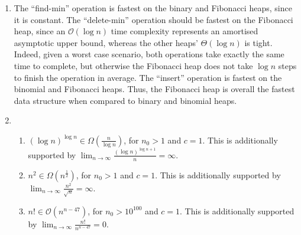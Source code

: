 \documentclass[12pt]{article}
\begin{document}
\begin{enumerate}
\begin{enumerate}
\begin{table}[htbp]
\begin{tabular}{l*{7}{r}}
        $       n$ & $\num{1.00E+10}$ & $\num{6.00E+11}$ & $\num{3.60E+13}$ & $\num{8.64E+14}$ & $\num{2.59E+16}$ & $\num{3.11E+17}$ & $\num{3.11E+19}$ \\
        $ n \lg n$ & $\num{3.52E+08}$ & $\num{1.76E+10}$ & $\num{9.06E+11}$ & $\num{1.96E+13}$ & $\num{5.30E+14}$ & $\num{5.94E+15}$ & $\num{5.28E+17}$ \\
        $   n^{2}$ & $\num{1.00E+05}$ & $\num{7.75E+05}$ & $\num{6.00E+06}$ & $\num{2.94E+07}$ & $\num{1.61E+08}$ & $\num{5.58E+08}$ & $\num{5.58E+09}$ \\
        $   n^{3}$ & $\num{2.15E+03}$ & $\num{8.43E+03}$ & $\num{3.30E+04}$ & $\num{9.52E+04}$ & $\num{2.96E+05}$ & $\num{6.78E+05}$ & $\num{3.14E+06}$ \\
        $   2^{n}$ & $\num{3.32E+01}$ & $\num{3.91E+01}$ & $\num{4.50E+01}$ & $\num{4.96E+01}$ & $\num{5.45E+01}$ & $\num{5.81E+01}$ & $\num{6.48E+01}$ \\
        $      n!$ & $\num{1.30E+01}$ & $\num{1.40E+01}$ & $\num{1.60E+01}$ & $\num{1.70E+01}$ & $\num{1.80E+01}$ & $\num{1.90E+01}$ & $\num{2.10E+01}$ \\
        \bottomrule
      \end{tabular}
    \end{table}
    \item The ``find-min'' operation is fastest on the binary and Fibonacci heaps, since it is constant. The ``delete-min'' operation should be fastest on the Fibonacci heap, since an $\mathcal{O}(\log n)$ time complexity represents an amortised asymptotic upper bound, whereas the other heaps' $\Theta(\log n)$ is tight. Indeed, given a worst case scenario, both operations take exactly the same time to complete, but otherwise the Fibonacci heap does not take $\log n$ steps to finish the operation in average. The ``insert'' operation is fastest on the binomial and Fibonacci heaps. Thus, the Fibonacci heap is overall the fastest data structure when compared to binary and binomial heaps.
    \item
    \begin{enumerate}
      \item $(\log n)^{\log n} \in \Omega(\frac{n}{\log n})$, for $n_{0} > 1$ and $c = 1$. This is additionally supported by $\lim_{n\to\infty} \frac{(\log n)^{\log n + 1}}{n} = \infty$.
      \item $n^{2} \in \Omega(n^{\frac{1}{2}})$, for $n_{0} > 1$ and $c = 1$. This is additionally supported by $\lim_{n\to\infty} \frac{n^{2}}{\sqrt{n}} = \infty$. 
      \item $n! \in \mathcal{O}(n^{n - 47})$, for $n_{0} > 10^{100}$ and $c = 1$. This is additionally supported by $\lim_{n\to\infty} \frac{n!}{n^{n - 47}} = 0$.

\end{enumerate}
\end{enumerate}
\end{enumerate}
\end{document}
